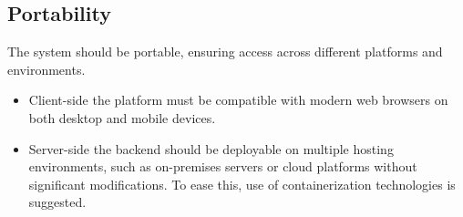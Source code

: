 \subsection{Portability}
\label{subsec:portability}%
The system should be portable, ensuring access across different platforms and environments.
\begin{itemize}
    \item Client-side the platform must be compatible with modern web browsers on both desktop and mobile devices.
    \item Server-side the backend should be deployable on multiple hosting environments, such as on-premises servers or cloud platforms without significant modifications. To ease this, use of containerization technologies is suggested.
\end{itemize}